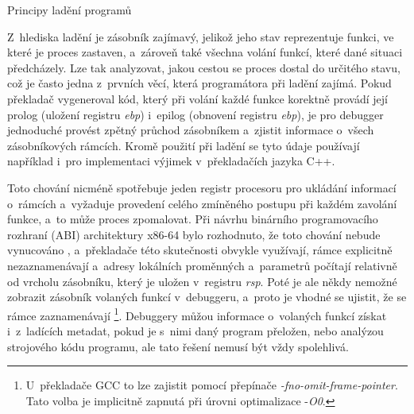 \documentclass[czech,bachelor,male,python,dept460,hidelinks]{diploma}						%
\newcommand{\parspace}[1][]{
	\ifthenelse{\isempty{#1}}{\vspace{0mm}}{\vspace{#1}}
	\par
}
\begin{document}
\begin{section}{Principy ladění programů}
		
		\parspace Z~hlediska ladění je zásobník zajímavý, jelikož jeho stav reprezentuje funkci, ve které je proces zastaven, a~zároveň také všechna volání
		funkcí, které dané situaci předcházely. Lze tak analyzovat, jakou cestou se proces dostal do určitého stavu, což je často jedna z~prvních věcí, která
		programátora při ladění zajímá. Pokud překladač vygeneroval kód, který při volání každé funkce korektně provádí její prolog (uložení registru \textit{ebp})
		i~epilog (obnovení registru \textit{ebp}), je pro debugger jednoduché provést zpětný průchod zásobníkem a~zjistit informace o~všech zásobníkových rámcích.
		Kromě použití při ladění se tyto údaje používají například i~pro implementaci výjimek v~překladačích jazyka C++.
		
		\parspace Toto chování nicméně spotřebuje jeden registr procesoru pro ukládání informací o~rámcích a~vyžaduje provedení celého zmíněného postupu při každém
		zavolání funkce, a~to může proces zpomalovat. Při návrhu binárního programovacího rozhraní (ABI) architektury x86-64 bylo rozhodnuto, že toto chování nebude
		vynucováno \cite[16]{x64abi}, a~překladače této skutečnosti obvykle využívají, rámce explicitně nezaznamenávají a~adresy
		lokálních proměnných a~parametrů počítají relativně od vrcholu zásobníku, který je uložen v~registru \textit{rsp}.
		Poté je ale někdy nemožné zobrazit zásobník volaných funkcí v~debuggeru, a~proto je vhodné se ujistit,
		že se rámce zaznamenávají \footnote{U~překladače GCC to lze zajistit pomocí přepínače \textit{-fno-omit-frame-pointer}.
		Tato volba je implicitně zapnutá při úrovni optimalizace -\textit{O0}. }.
		Debuggery můžou informace o~volaných funkcí získat i~z~ladících metadat, pokud je s~nimi daný program přeložen,
		nebo analýzou strojového kódu programu, ale tato řešení nemusí být vždy spolehlivá.
\end{section}
\end{document}
